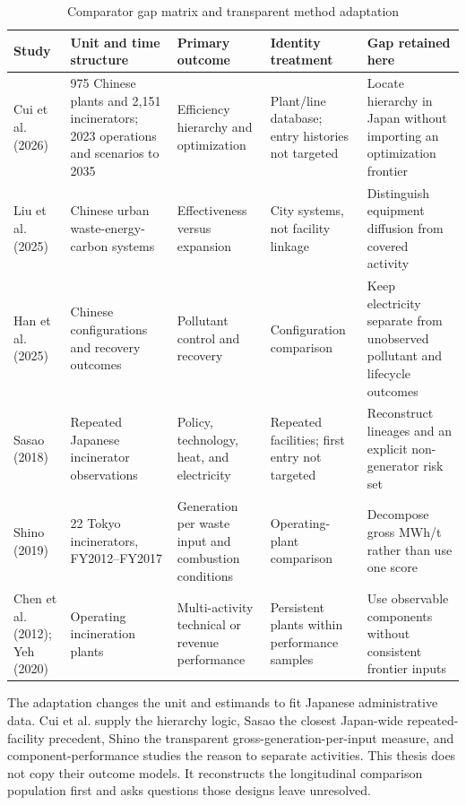 \documentclass[12pt,a4paper]{article}
\begin{document}
\begin{table}[H]
\centering
\caption{Comparator gap matrix and transparent method adaptation}
\label{tab:comparators}
\scriptsize
\setlength{\tabcolsep}{3.2pt}
\renewcommand{\arraystretch}{1.14}
\begin{tabularx}{\textwidth}{L{1.45cm}YYYY}
\toprule
Study & Unit and time structure & Primary outcome & Identity treatment &
Gap retained here \\
\midrule
Cui et al. (2026) & 975 Chinese plants and 2,151 incinerators; 2023 operations
and scenarios to 2035 & Efficiency hierarchy and optimization & Plant/line
database; entry histories not targeted & Locate hierarchy in Japan without
importing an optimization frontier \\
Liu et al. (2025) & Chinese urban waste-energy-carbon systems & Effectiveness
versus expansion & City systems, not facility linkage & Distinguish equipment
diffusion from covered activity \\
Han et al. (2025) & Chinese configurations and recovery outcomes & Pollutant
control and recovery & Configuration comparison & Keep electricity separate
from unobserved pollutant and lifecycle outcomes \\
Sasao (2018) & Repeated Japanese incinerator observations & Policy, technology,
heat, and electricity & Repeated facilities; first entry not targeted &
Reconstruct lineages and an explicit non-generator risk set \\
Shino (2019) & 22 Tokyo incinerators, FY2012--FY2017 & Generation per waste input
and combustion conditions & Operating-plant comparison & Decompose gross MWh/t
rather than use one score \\
Chen et al. (2012); Yeh (2020) & Operating incineration plants & Multi-activity
technical or revenue performance & Persistent plants within performance samples
& Use observable components without consistent frontier inputs \\
\bottomrule
\end{tabularx}
\renewcommand{\arraystretch}{1}
\normalsize
\end{table}

The adaptation changes the unit and estimands to fit Japanese administrative
data. Cui et al. supply the hierarchy logic, Sasao the closest Japan-wide
repeated-facility precedent, Shino the transparent gross-generation-per-input
measure, and component-performance studies the reason to separate activities.
This thesis does not copy their outcome models. It reconstructs the longitudinal
comparison population first and asks questions those designs leave unresolved.
\end{document}
